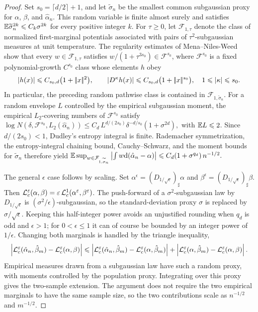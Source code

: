 \begin{proof}
Set $s_0=\lceil d/2\rceil+1$, and let $\widetilde\sigma_n$ be the smallest common subgaussian proxy for $\alpha$, $\beta$, and $\hat\alpha_n$. This random variable is finite almost surely and satisfies $\mathbb{E}\widetilde\sigma_n^{2k}\leqslant C_k\sigma^{2k}$ for every positive integer $k$. For $\tau\geq0$, let $\mathcal F_{1,\tau}$ denote the class of normalized first-marginal potentials associated with pairs of $\tau^2$-subgaussian measures at unit temperature. The regularity estimates of Mena--Niles-Weed show that every $w\in\mathcal F_{1,\tau}$ satisfies $w/(1+\tau^{3s_0})\in\mathcal F^{s_0}$, where $\mathcal F^{s_0}$ is a fixed polynomial-growth $C^{s_0}$ class whose elements $h$ obey
\[
\left\lvert h(x)\right\rvert\leqslant C_{s_0,d}\bigl(1+|\!| x |\!|^2\bigr),
\qquad
\left\lvert D^\kappa h(x)\right\rvert\leqslant C_{s_0,d}\bigl(1+|\!| x |\!|^{s_0}\bigr),
\quad 1\leqslant|\kappa|\leqslant s_0.
\]
In particular, the preceding random pathwise class is contained in $\mathcal F_{1,\widetilde\sigma_n}$. For a random envelope $L$ controlled by the empirical subgaussian moment, the empirical $L_2$-covering numbers of $\mathcal F^{s_0}$ satisfy
\(\log N(\delta,\mathcal F^{s_0},L_2(\hat\alpha_n)) \leq C_d\,L^{d/(2s_0)}\delta^{-d/s_0}(1+\sigma^{2d}),\)
with $\mathbb{E} L\leqslant2$. Since $d/(2s_0)<1$, Dudley's entropy integral is finite. Rademacher symmetrization, the entropy-integral chaining bound, Cauchy--Schwarz, and the moment bounds for $\widetilde\sigma_n$ therefore yield
\(\mathbb{E}\sup_{w\in\mathcal F_{1,\widetilde\sigma_n}} \left\lvert\int w\mathrm{d}(\hat\alpha_n-\alpha)\right\rvert \leqslant C_d(1+\sigma^{q_d})\,n^{-1/2}.\)

The general \(\epsilon\) case follows by scaling. Set \(\alpha^\epsilon=(D_{1/\sqrt\epsilon})_\sharp\alpha\) and \(\beta^\epsilon=(D_{1/\sqrt\epsilon})_\sharp\beta\). Then
$\mathcal{L}_c^\varepsilon(\alpha,\beta) = \varepsilon\,\mathcal{L}_c^1(\alpha^\varepsilon,\beta^\varepsilon)$.
The push-forward of a \(\sigma^2\)-subgaussian law by \(D_{1/\sqrt\epsilon}\) is \((\sigma^2/\epsilon)\)-subgaussian, so the standard-deviation proxy \(\sigma\) is replaced by \(\sigma/\sqrt\epsilon\). Keeping this half-integer power avoids an unjustified rounding when $q_d$ is odd and $\epsilon>1$; for $0<\epsilon\leq1$ it can of course be bounded by an integer power of $1/\epsilon$.
Changing both marginals is handled by the triangle inequality,
\[
\left\lvert\mathcal{L}_c^\varepsilon(\hat\alpha_n,\hat\beta_m)-\mathcal{L}_c^\varepsilon(\alpha,\beta)\right\rvert
\leqslant
\left\lvert\mathcal{L}_c^\varepsilon(\hat\alpha_n,\hat\beta_m)-\mathcal{L}_c^\varepsilon(\alpha,\hat\beta_m)\right\rvert
+
\left\lvert\mathcal{L}_c^\varepsilon(\alpha,\hat\beta_m)-\mathcal{L}_c^\varepsilon(\alpha,\beta)\right\rvert.
\]
Empirical measures drawn from a subgaussian law have such a random proxy, with moments controlled by the population proxy. Integrating over this proxy gives the two-sample extension. The argument does not require the two empirical marginals to have the same sample size, so the two contributions scale as \(n^{-1/2}\) and \(m^{-1/2}\).


\end{proof}
